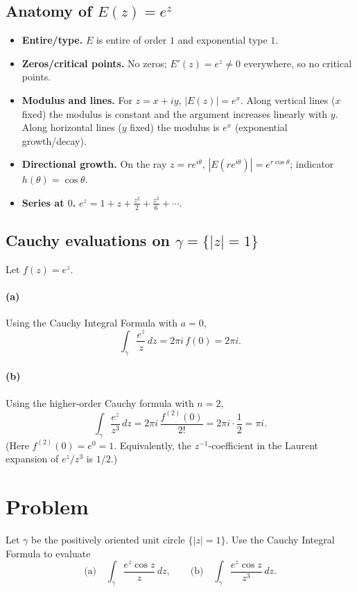 \documentclass[11pt]{article}
\begin{document}
	\subsection*{Anatomy of \(E(z)=e^{z}\)}
	
	\begin{itemize}
		\item \textbf{Entire/type.} \(E\) is entire of order \(1\) and exponential type \(1\).
		\item \textbf{Zeros/critical points.} No zeros; \(E'(z)=e^{z}\neq 0\) everywhere, so no critical points.
		\item \textbf{Modulus and lines.} For \(z=x+iy\),
		\(|E(z)|=e^{x}\).
		Along vertical lines (\(x\) fixed) the modulus is constant and the argument increases linearly with \(y\).
		Along horizontal lines (\(y\) fixed) the modulus is \(e^{x}\) (exponential growth/decay).
		\item \textbf{Directional growth.} On the ray \(z=re^{i\theta}\), \(|E(re^{i\theta})|=e^{r\cos\theta}\); indicator \(h(\theta)=\cos\theta\).
		\item \textbf{Series at \(0\).} \(e^{z}=1+z+\frac{z^{2}}{2}+\frac{z^{3}}{6}+\cdots\).
	\end{itemize}
	
	\subsection*{Cauchy evaluations on \(\gamma=\{|z|=1\}\)}
	
	Let \(f(z)=e^{z}\).
	\paragraph{(a)} Using the Cauchy Integral Formula with \(a=0\),
	\[
	\int_{\gamma}\frac{e^{z}}{z}\,dz
	=2\pi i\,f(0)
	=2\pi i.
	\]
	
	\paragraph{(b)} Using the higher-order Cauchy formula with \(n=2\),
	\[
	\int_{\gamma}\frac{e^{z}}{z^{3}}\,dz
	=2\pi i\,\frac{f^{(2)}(0)}{2!}
	=2\pi i\cdot\frac{1}{2}
	=\pi i.
	\]
	(Here \(f^{(2)}(0)=e^{0}=1\). Equivalently, the \(z^{-1}\)-coefficient in the Laurent expansion of \(e^{z}/z^{3}\) is \(1/2\).)
	
	\section*{Problem}
	Let $\gamma$ be the positively oriented unit circle $\{|z|=1\}$. 
	Use the Cauchy Integral Formula to evaluate
	\[
	\text{(a)}\quad \int_{\gamma}\frac{e^{z}\cos z}{z}\,dz,
	\qquad
	\text{(b)}\quad \int_{\gamma}\frac{e^{z}\cos z}{z^{3}}\,dz.
	\]
	
\end{document}
